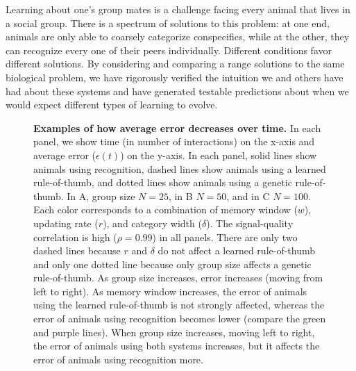 Learning about one's group mates is a challenge facing every animal that lives in a social group. There is a spectrum of solutions to this problem: at one end, animals are only able to coarsely categorize conspecifics, while at the other, they can recognize every one of their peers individually. Different conditions favor different solutions. By considering and comparing a range solutions to the same biological problem, we have rigorously verified the intuition we and others have had about these systems and have generated testable predictions about when we would expect different types of learning to evolve. 
  

\newpage



\newpage
\begin{figure}
\caption{\label{learning_curves} \sffamily\small\textbf{Examples of how average error decreases over time.}
In each panel, we show time (in number of interactions) on the x-axis and average error ($\epsilon(t)$) on the y-axis. In each panel, solid lines show animals using recognition, dashed lines show animals using a learned rule-of-thumb, and dotted lines show animals using a genetic rule-of-thumb. In A, group size $N=25$, in B $N=50$, and in C $N=100$. Each color corresponds to a combination of memory window ($w$), updating rate ($r$), and category width ($\delta$). The signal-quality correlation is high ($\rho=0.99$) in all panels. There are only two dashed lines because $r$ and $\delta$ do not affect a learned rule-of-thumb and only one dotted line because only group size affects a genetic rule-of-thumb. As group size increases, error increases (moving from left to right). As memory window increases, the error of animals using the learned rule-of-thumb is not strongly affected, whereas the error of animals using recognition becomes lower (compare the green and purple lines). When group size increases, moving left to right, the error of animals using both systems increases, but it affects the error of animals using recognition more.}
\end{figure}

